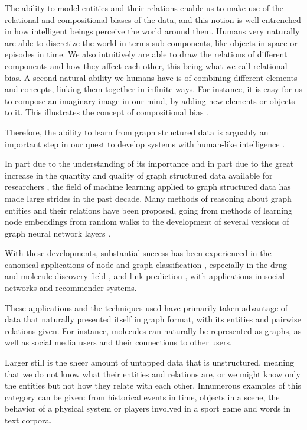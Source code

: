 \documentclass[12pt,a4paper]{article}
\begin{document}
	The ability to model entities and their relations enable us to make use of the relational and compositional biases of the data, and this notion is well entrenched in how intelligent beings perceive the world around them. Humans very naturally are able to discretize the world in terms sub-components, like objects in space or episodes in time. We also intuitively are able to draw the relations of different components and how they affect each other, this being what we call relational bias. A second natural ability we humans have is of combining different elements and concepts, linking them together in infinite ways. For instance, it is easy for us to compose an imaginary image in our mind, by adding new elements or objects to it. This illustrates the concept of compositional bias \citep{Battaglia2018, Kipf2020}. 
	
	Therefore, the ability to learn from graph structured data is arguably an important step in our quest to develop systems with human-like intelligence \citep{Battaglia2018}.
	
	In part due to the understanding of its importance and in part due to the great increase in the quantity and quality of graph structured data available for researchers \citep{Hamilton2020}, the field of machine learning applied to graph structured data has made large strides in the past decade. Many methods of reasoning about graph entities and their relations have been proposed, going from methods of learning node embeddings from random walks \citep{Perozzi2014, Grover2016} to the development of several versions of graph neural network layers \citep{Scarcelli2009, KipfandWelling2016, Gilmer2017, Battaglia2018}. 
	
	With these developments, substantial success has been experienced in the canonical applications of node and graph classification \citep{KipfandWelling2017}, especially in the drug and molecule discovery field \citep{Gilmer2017}, and link prediction \citep{KipfandWelling2016}, with applications in social networks and recommender systems. 
	
	These applications and the techniques used have primarily taken advantage of data that naturally presented itself in graph format, with its entities and pairwise relations given. For instance, molecules can naturally be represented as graphs, as well as social media users and their connections to other users.
	
	Larger still is the sheer amount of untapped data that is unstructured, meaning that we do not know what their entities and relations are, or we might know only the entities but not how they relate with each other. Innumerous examples of this category can be given: from historical events in time, objects in a scene, the behavior of a physical system or players involved in a sport game and words in text corpora. 
	
\end{document}
